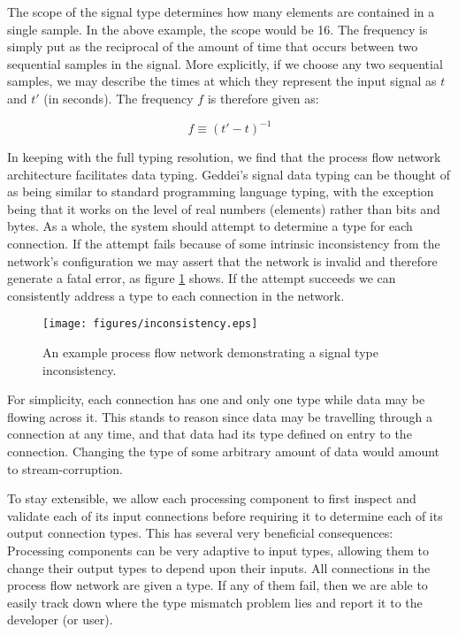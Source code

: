 The scope of the signal type determines how many elements are contained in a single sample. In the above example, the scope would be 16. The frequency is simply put as the reciprocal of the amount of time that occurs between two sequential samples in the signal. More explicitly, if we choose any two sequential samples, we may describe the times at which they represent the input signal as $t$ and $t'$ (in seconds). The frequency $f$ is therefore given as:

\begin{equation}
f \equiv (t' - t)^{-1}
\end{equation}

In keeping with the full typing resolution, we find that the process flow network architecture facilitates data typing. Geddei's signal data typing can be thought of as being similar to standard programming language typing, with the exception being that it works on the level of real numbers (elements) rather than bits and bytes. As a whole, the system should attempt to determine a type for each connection. If the attempt fails because of some intrinsic inconsistency from the network's configuration we may assert that the network is invalid and therefore generate a fatal error, as figure \ref{fig:inconsistency} shows. If the attempt succeeds we can consistently address a type to each connection in the network.

\begin{figure}[ht!]
\centering
\texttt{[image: figures/inconsistency.eps]}
\caption{An example process flow network demonstrating a signal type inconsistency.}
\label{fig:inconsistency}
\end{figure}

For simplicity, each connection has one and only one type while data may be flowing across it. This stands to reason since data may be travelling through a connection at any time, and that data had its type defined on entry to the connection. Changing the type of some arbitrary amount of data would amount to stream-corruption.

To stay extensible, we allow each processing component to first inspect and validate each of its input connections before requiring it to determine each of its output connection types. This has several very beneficial consequences: Processing components can be very adaptive to input types, allowing them to change their output types to depend upon their inputs. All connections in the process flow network are given a type. If any of them fail, then we are able to easily track down where the type mismatch problem lies and report it to the developer (or user).

